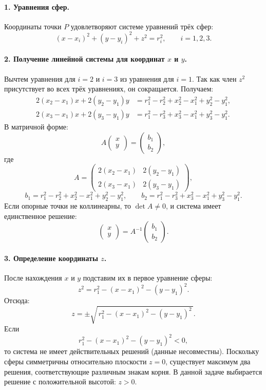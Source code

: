 \paragraph{1. Уравнения сфер.}
Координаты точки \(P\) удовлетворяют системе уравнений трёх сфер:
\[
(x - x_i)^2 + (y - y_i)^2 + z^2 = r_i^2, \qquad i = 1,2,3.
\]

\paragraph{2. Получение линейной системы для координат \(x\) и \(y\).}
Вычтем уравнения для \(i=2\) и \(i=3\) из уравнения для \(i=1\).
Так как член \(z^2\) присутствует во всех трёх уравнениях, он сокращается. Получаем:
\begin{align}
2(x_2-x_1)x + 2(y_2-y_1)y &= r_1^2 - r_2^2 + x_2^2 - x_1^2 + y_2^2 - y_1^2, \\
2(x_3-x_1)x + 2(y_3-y_1)y &= r_1^2 - r_3^2 + x_3^2 - x_1^2 + y_3^2 - y_1^2.
\end{align}
В матричной форме:
\[
A
\begin{pmatrix} x \\ y \end{pmatrix}
=
\begin{pmatrix} b_1 \\ b_2 \end{pmatrix},
\]
где
\[
A =
\begin{pmatrix}
2(x_2-x_1) & 2(y_2-y_1) \\
2(x_3-x_1) & 2(y_3-y_1)
\end{pmatrix},
\]
\[
b_1 = r_1^2 - r_2^2 + x_2^2 - x_1^2 + y_2^2 - y_1^2,
\qquad
b_2 = r_1^2 - r_3^2 + x_3^2 - x_1^2 + y_3^2 - y_1^2.
\]
Если опорные точки не коллинеарны, то \(\det A \neq 0\), и система имеет единственное решение:
\[
\begin{pmatrix} x \\ y \end{pmatrix} = A^{-1} \begin{pmatrix} b_1 \\ b_2 \end{pmatrix}.
\]

\paragraph{3. Определение координаты \(z\).}
После нахождения \(x\) и \(y\) подставим их в первое уравнение сферы:
\[
z^2 = r_1^2 - (x - x_1)^2 - (y - y_1)^2.
\]
Отсюда:
\[
z = \pm\sqrt{\,r_1^2 - (x - x_1)^2 - (y - y_1)^2\,}.
\]
Если
\[
r_1^2 - (x - x_1)^2 - (y - y_1)^2 < 0,
\]
то система не имеет действительных решений (данные несовместны).
Поскольку сферы симметричны относительно плоскости \(z=0\), существует максимум два решения, соответствующие различным знакам корня.
В данной задаче выбирается решение с положительной высотой: \(z > 0\).

